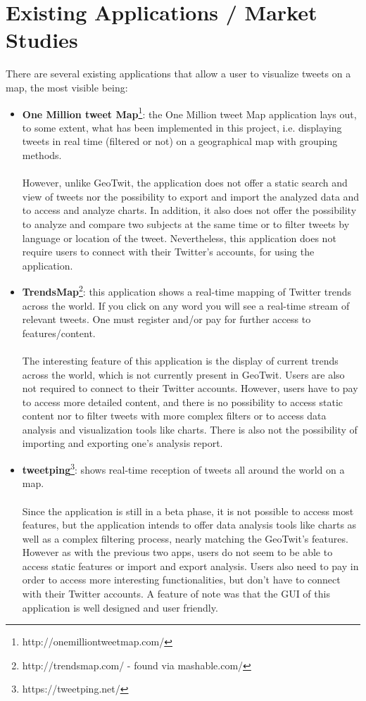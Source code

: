 \documentclass[a4paper,11pt]{report}
\begin{document}
\section{Existing Applications / Market Studies}
There are several existing applications that allow a user to visualize tweets on a map, the most visible being:
\begin{itemize}
	\item \textbf{One Million tweet Map}\footnote{http://onemilliontweetmap.com/}: the One Million tweet Map application lays out, to some extent, what has been implemented in this project, i.e. displaying tweets in real time (filtered or not) on a geographical map with grouping methods.\\\\
	However, unlike GeoTwit, the application does not offer a static search and view of tweets nor the possibility to export and import the analyzed data and to access and analyze charts. In addition, it also does not offer the possibility to analyze and compare two subjects at the same time or to filter tweets by language or location of the tweet. Nevertheless, this application does not require users to connect with their Twitter's accounts, for using the application.
	\item \textbf{TrendsMap}\footnote{http://trendsmap.com/ - found via mashable.com/}: this application shows a real-time mapping of Twitter trends across the world. If you click on any word you will see a real-time stream of relevant tweets. One must register and/or pay for further access to features/content.\\\\
	The interesting feature of this application is the display of current trends across the world, which is not currently present in GeoTwit. Users are also not required to connect to their Twitter accounts. However, users have to pay to access more detailed content, and there is no possibility to access static content nor to filter tweets with more complex filters or to access data analysis and visualization tools like charts. There is also not the possibility of importing and exporting one's analysis report.
	\item \textbf{tweetping}\footnote{https://tweetping.net/}: shows real-time reception of tweets all around the world on a map.\\\\
	Since the application is still in a beta phase, it is not possible to access most features, but the application intends to offer data analysis tools like charts as well as a complex filtering process, nearly matching the GeoTwit's features. However as with the previous two apps, users do not seem to be able to access static features or import and export analysis. Users also need to pay in order to access more interesting functionalities, but don't have to connect with their Twitter accounts. A feature of note was that the GUI of this application is well designed and user friendly.

\end{itemize}
\end{document}
